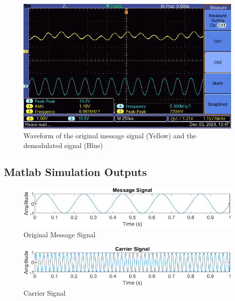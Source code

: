 \documentclass[12pt]{article}
\begin{document}
\begin{figure}[H]
    \centering
    \begin{minipage}{0.45\textwidth}
        \centering
        \includegraphics[width=\textwidth]{Lr1-3-msg-tr-msg.JPG}
        \caption{Waveform of the original message signal (Yellow) and the demodulated signal (Blue)}
        \label{fig:demodulated_signal}
    \end{minipage}
\end{figure}

\subsection*{Matlab Simulation Outputs}
\begin{figure}[H]
    \centering
    \includegraphics[width=\textwidth]{msg.png}
    \caption{Original Message Signal}
    \label{fig:simulation_message_signal}
\end{figure}

\begin{figure}[H]
    \centering
    \includegraphics[width=\textwidth]{car.png}
    \caption{Carrier Signal}
    \label{fig:simulation_carrier_signal}
\end{figure}
\end{document}
